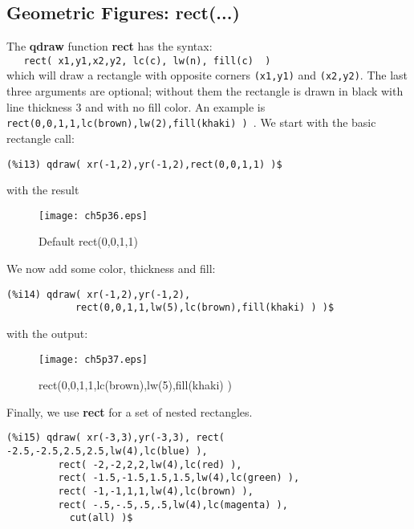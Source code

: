 \documentclass[12pt]{article}
\begin{document}
\subsection{Geometric Figures: rect(...) }
The \textbf{qdraw} function \textbf{rect} has the syntax:\\
\verb|   rect( x1,y1,x2,y2, lc(c), lw(n), fill(c)  ) |\\
  which will draw a rectangle with opposite corners \verb|(x1,y1)| and \verb|(x2,y2)|.
The last three arguments are optional; without them the rectangle is drawn in
  black with line thickness 3 and with no fill color.
An example is \verb|rect(0,0,1,1,lc(brown),lw(2),fill(khaki) ) |.
We start with the basic rectangle call:
\small
\begin{verbatim}
(%i13) qdraw( xr(-1,2),yr(-1,2),rect(0,0,1,1) )$
\end{verbatim}
\normalsize
%  
with the result
\begin{figure} [h]
   \centerline{\texttt{[image: ch5p36.eps]} }
	\caption{Default rect(0,0,1,1) }
\end{figure}      

\smallskip
We now add some color, thickness and fill:
\small
\begin{verbatim}
(%i14) qdraw( xr(-1,2),yr(-1,2),
            rect(0,0,1,1,lw(5),lc(brown),fill(khaki) ) )$
\end{verbatim}
\normalsize
%
with the output:
\begin{figure} [h]
   \centerline{\texttt{[image: ch5p37.eps]} }
	\caption{rect(0,0,1,1,lc(brown),lw(5),fill(khaki) ) }
\end{figure}      

\newpage
Finally, we use \textbf{rect} for a set of nested rectangles.
\small
\begin{verbatim}
(%i15) qdraw( xr(-3,3),yr(-3,3), rect( -2.5,-2.5,2.5,2.5,lw(4),lc(blue) ),
         rect( -2,-2,2,2,lw(4),lc(red) ),
         rect( -1.5,-1.5,1.5,1.5,lw(4),lc(green) ),
         rect( -1,-1,1,1,lw(4),lc(brown) ),
         rect( -.5,-.5,.5,.5,lw(4),lc(magenta) ),
           cut(all) )$
\end{verbatim}
\normalsize
\end{document}

